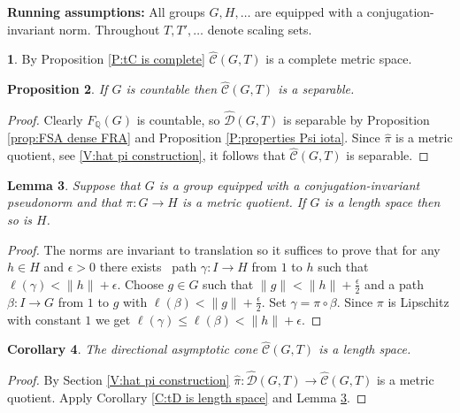 \documentclass[12pt]{amsart}
\newtheorem{prop}{Proposition}[section]
\newtheorem{cor}[prop]{Corollary}
\newtheorem{lemma}[prop]{Lemma}
\theoremstyle{definition}
\newtheorem{void}[prop]{}
\def\QQ{\ensuremath{\mathbb{Q}}}
\def\Free{F}
\def\D{\mathcal{D}}
\def\tC{\hat{\mathcal{C}}}
\def\tD{\hat{\D}}
\begin{document}
\noindent
{\bf Running assumptions:}
All groups $G,H,\dots$ are equipped with a conjugation-invariant norm.
Throughout $T,T',\dots$ denote scaling sets.

\begin{void}
By Proposition \ref{P:tC is complete} $\tC(G,T)$ is a complete metric space.
\end{void}


\begin{prop}\label{P:polish cone}%
If $G$ is countable then $\tC(G,T)$ is a separable.
\end{prop}

\begin{proof}
Clearly $\Free_\QQ(G)$ is countable, so $\tD(G,T)$ is separable by Proposition \ref{prop:FSA dense FRA} and Proposition \ref{P:properties Psi iota}.
Since $\hat{\pi}$ is a metric quotient, see \ref{V:hat pi construction}, it follows that $\tC(G,T)$ is separable.
\end{proof}




\begin{lemma}\label{L:quotient length spaces}
Suppose that $G$ is a group equipped with a conjugation-invariant pseudonorm and that $\pi \colon G \to H$ is a metric quotient.
If $G$ is a length space then so is $H$.
\end{lemma}

\begin{proof}
The norms are invariant to translation so it suffices to prove that for any $h \in H$ and $\epsilon >0$ there exists \ path $\gamma \colon I \to H$ from $1$ to $h$ such that $\ell(\gamma)<\|h\|+\epsilon$.
Choose $g \in G$ such that $\|g\| < \|h\|+\tfrac{\epsilon}{2}$ and a path $\beta \colon I \to G$ from $1$ to $g$ with $\ell(\beta) < \|g\|+\tfrac{\epsilon}{2}$.
Set $\gamma = \pi \circ \beta$.
Since $\pi$ is Lipschitz with constant $1$ we get $\ell(\gamma) \leq \ell(\beta)<\|h\|+\epsilon$.
\end{proof}



\begin{cor}\label{C:tC length space} %
The directional asymptotic cone $\tC(G,T)$ is a length space. 
\end{cor}

\begin{proof}
By Section \ref{V:hat pi construction} $\hat{\pi} \colon \tD(G,T) \to \tC(G,T)$ is a metric quotient.
Apply Corollary \ref{C:tD is length space} and Lemma \ref{L:quotient length spaces}.
\end{proof}
\end{document}
